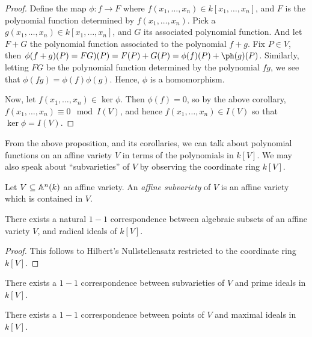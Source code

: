 \begin{proof}
  Define the map $\phi:f \xrightarrow{} F$ where $f(x_1, \dots, x_n)
  \in k[x_1, \dots, x_n]$, and $F$ is the polynomial function
  determined by $f(x_1, \dots, x_n)$. Pick a $g(x_1, \dots ,x_n) \in
  k[x_1, \dots, x_n]$, and $G$ its associated polynomial function.
  And let $F+G$ the polynomial function associated to the polynomial
  $f+g$. Fix $P  \in V$, then $\phi(f+g)(P)= F G)(P)=F(P)+G(P)=
  \phi(f)(P)+\ph (g)(P)$. Similarly, letting $FG$ be the polynomial
  function determined by the polynomial $fg$, we see that
  $\phi(fg)=\phi(f)\phi(g)$. Hence, $\phi$ is a homomorphism.

  Now, let $f(x_1, \dots, x_n) \in \ker{\phi}$. Then $\phi(f)=0$, so by
  the above corollary, $f(x_1, \dots, x_n) \equiv 0 \mod{I(V)}$, and
  hence $f(x_1, \dots, x_n) \in I(V)$ so that $\ker{\phi}=I(V)$.
\end{proof}

From the above proposition, and its corollaries, we can talk about
polynomial functions on an affine variety $V$ in terms of the
polynomials in $k[V]$. We may also speak about ``subvarieties'' of
$V$ by observing the coordinate ring $k[V]$.

\begin{definition}
  Let $V \subseteq \mathbb{A}^n(k)$ an affine variety. An \textit{affine
  subvariety} of $V$ is an affine variety which is contained in $V$.
\end{definition}

\begin{proposition}\label{proposition_11.1.2}
  There exists a natural $1-1$ correspondence between algebraic
  subsets of an affine variety  $V$, and radical ideals of $k[V]$.
\end{proposition}
\begin{proof}
  This follows to Hilbert's Nullstellensatz restricted to the
  coordinate ring $k[V]$.
\end{proof}
\begin{corollary}
  There exists a $1-1$ correspondence between subvarieties of $V$
  and prime ideals in  $k[V]$.
\end{corollary}
\begin{corollary}
  There exists a $1-1$ correspondence between points of $V$ and
  maximal ideals in $k[V]$.
\end{corollary}

